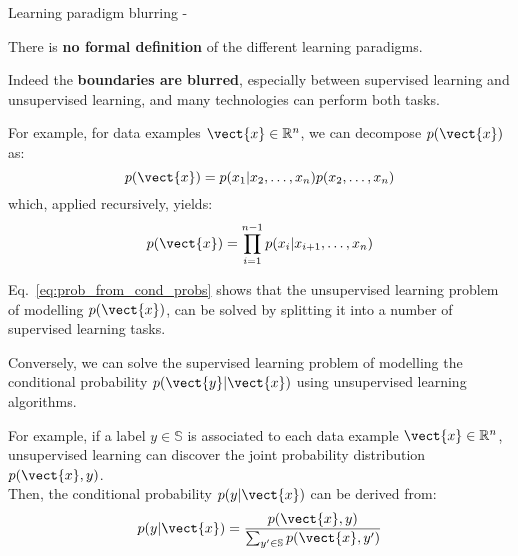 %
%
%

\begin{frame}[t,allowframebreaks]{
    Learning paradigm blurring - }

    There is {\bf no formal definition} 
    of the different learning paradigms.\\
    \vspace{0.2cm}

    Indeed the {\bf boundaries are blurred}, especially between
    \gls{supervised learning} and 
    \gls{unsupervised learning},
    and many technologies can perform both tasks.\\
    \vspace{0.3cm}

    For example, for data examples $\vect{x} \in \mathbb{R}^n$,
    we can decompose $p(\vect{x})$ as:
    \begin{equation}
        p(\vect{x}) = p(x_1 | x_2, \dots, x_n) p(x_2, \dots, x_n)
    \end{equation}
    which, applied recursively, yields:
    \begin{equation}
        p(\vect{x}) = \prod_{i=1}^{n-1} p(x_i | x_{i+1}, \dots, x_{n})
        \label{eq:prob_from_cond_probs}
    \end{equation}

    Eq.~\ref{eq:prob_from_cond_probs} shows that the 
    \gls{unsupervised learning} 
    problem of modelling $p(\vect{x})$,
    can be solved by splitting it into a number of 
    \gls{supervised learning} tasks.\\

    \framebreak


    Conversely, 
    we can solve the 
    \gls{supervised learning} 
    problem of modelling the conditional probability 
    $p(\vect{y}|\vect{x})$ using 
    \gls{unsupervised learning} algorithms.\\
    \vspace{0.2cm}

    For example, if a label $y \in \mathbb{S}$ is associated 
    to each data example $\vect{x} \in \mathbb{R}^n$, 
    \gls{unsupervised learning} can discover the 
    joint probability distribution $p(\vect{x},y)$.\\
    \vspace{0.2cm}
    Then, the conditional probability $p(y|\vect{x})$
    can be derived from:
    \begin{equation}
        \displaystyle
        p(y|\vect{x}) = \frac{p(\vect{x},y)}{
            \sum_{y^\prime \in \mathbb{S}} p(\vect{x},y^\prime)}
        \label{eq:cond_prob_from_prob}
    \end{equation}


\end{frame}
